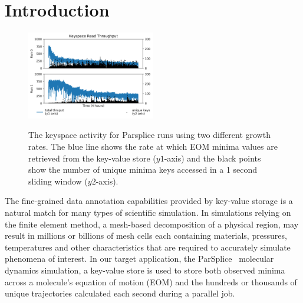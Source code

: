 \section{Introduction}


\begin{figure}[t]
  \noindent\includegraphics[width=0.5\textwidth]{figures/motivation-regimes.png}\\
  \caption{The keyspace activity for Parsplice runs using two different growth 
  rates.  The blue line shows the rate at which EOM minima values are retrieved
  from the key-value store (\(y1\)-axis) and the black points show the number of
  unique minima keys accessed in a 1 second sliding window (\(y2\)-axis).
  \label{fig:motivation-regimes}}
\end{figure}

The fine-grained data annotation capabilities provided by key-value storage is
a natural match for many types of scientific simulation. In simulations relying
on the finite element method, a mesh-based decomposition of a physical region,
may result in millions or billions of mesh cells each containing materials,
pressures, temperatures and other characteristics that are required to
accurately simulate phenomena of interest. In our target application, the
ParSplice~\cite{perez:jctc20150parsplice} molecular dynamics simulation, a
key-value store is used to store both observed minima across a molecule's
equation of motion (EOM) and the hundreds or thousands of unique trajectories
calculated each second during a parallel job. 

